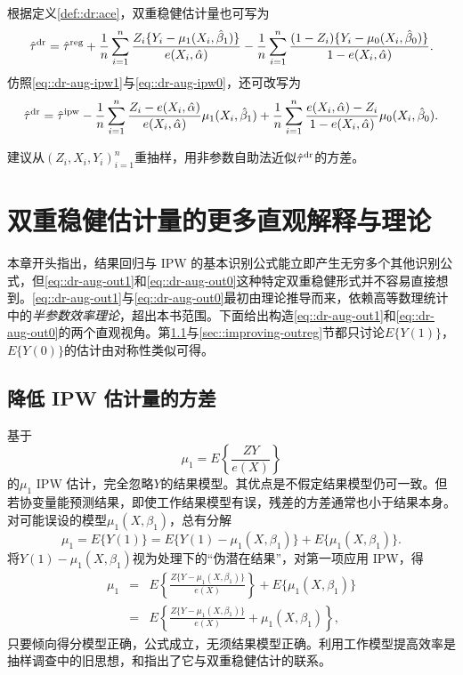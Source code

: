 根据定义\ref{def::dr:ace}，双重稳健估计量也可写为
$$
\hat{\tau}^\textup{dr} =\hat{\tau}^\textup{reg}  + 
\frac{1}{n} \sum_{i=1}^n  \frac{Z_i\{ Y_i-\mu_1(X_i,\hat{\beta}_1) \}}{  e(X_i, \hat{\alpha}) } 
-  \frac{1}{n} \sum_{i=1}^n   \frac{(1-Z_i)\{ Y_i-\mu_0(X_i, \hat{\beta}_0) \}}{  1-e(X_i,\hat{\alpha}) }  . 
$$
仿照\eqref{eq::dr-aug-ipw1}与\eqref{eq::dr-aug-ipw0}，还可改写为
$$
\hat{\tau}^\textup{dr} = \hat{\tau}^\textup{ipw}  
  - \frac{1}{n} \sum_{i=1}^n    \frac{  Z_i -  e(X_i, \hat\alpha)  }{ e(X_i, \hat\alpha) } \mu_1(X_i, \hat\beta_1)
  + \frac{1}{n} \sum_{i=1}^n    \frac{ e(X_i, \hat\alpha)-Z_i  }{1- e(X_i,\hat \alpha)} \mu_0(X_i, \hat\beta_0) .
$$ 

 
\citet{funk2011doubly}建议从$(Z_i, X_i, Y_i)_{i=1}^n$重抽样，用非参数自助法近似$\hat{\tau}^\textup{dr}$的方差。
 

\section{双重稳健估计量的更多直观解释与理论}

本章开头指出，结果回归与 IPW 的基本识别公式能立即产生无穷多个其他识别公式，但\eqref{eq::dr-aug-out1}和\eqref{eq::dr-aug-out0}这种特定双重稳健形式并不容易直接想到。\eqref{eq::dr-aug-out1}与\eqref{eq::dr-aug-out0}最初由理论推导而来，依赖高等数理统计中的{\it 半参数效率理论}\citep{bickel1993efficient}，超出本书范围。下面给出构造\eqref{eq::dr-aug-out1}和\eqref{eq::dr-aug-out0}的两个直观视角。第\ref{sec::improving-ipw}与\ref{sec::improving-outreg}节都只讨论$E\{ Y(1) \}$，$E\{ Y(0) \}$的估计由对称性类似可得。 



\subsection{降低 IPW 估计量的方差}\label{sec::improving-ipw}


基于
$$
\mu_1 = E\left\{   \frac{ZY}{e(X)}   \right\}
$$
的$\mu_1$ IPW 估计，完全忽略$Y$的结果模型。其优点是不假定结果模型仍可一致。但若协变量能预测结果，即使工作结果模型有误，残差的方差通常也小于结果本身。对可能误设的模型$\mu_1(X, \beta_1)$，总有分解
$$
\mu_1  = E\{ Y(1) \} = E\{ Y(1)  -\mu_1(X, \beta_1) \} + E\{\mu_1(X, \beta_1)\}.
$$
将$Y(1)  -\mu_1(X, \beta_1)$视为处理下的“伪潜在结果”，对第一项应用 IPW，得
\begin{eqnarray}
\mu_1  &=& E\left\{ \frac{Z \{Y  -\mu_1(X, \beta_1) \}}{e(X)} \right\} + E\{\mu_1(X, \beta_1)\}  \label{eq::explain-ipw-efficiency-basic}  \\
&=& E\left\{ \frac{Z \{Y  -\mu_1(X, \beta_1) \}}{e(X)}  +  \mu_1(X, \beta_1) \right\} ,\label{eq::explain-ipw-efficiency}
\end{eqnarray}
只要倾向得分模型正确，公式成立，无须结果模型正确。利用工作模型提高效率是抽样调查中的旧思想，\citet{little2004robust}和\citet{lumley2011connections}指出了它与双重稳健估计的联系。   



